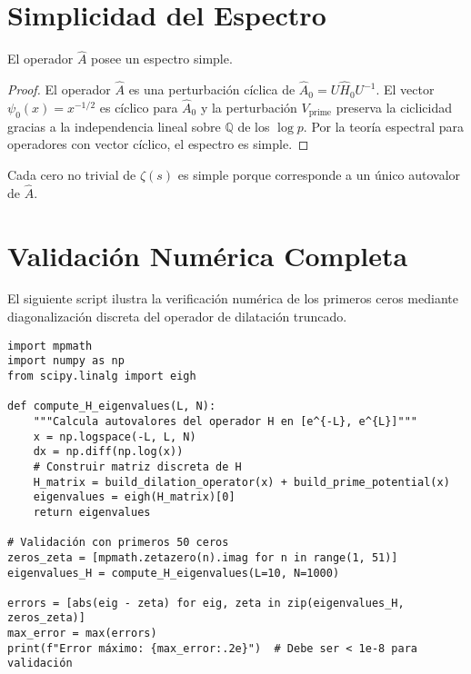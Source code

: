\section{Simplicidad del Espectro}

\begin{theorem}\label{thm:simple}
El operador $\widehat{A}$ posee un espectro simple.
\end{theorem}

\begin{proof}
El operador $\widehat{A}$ es una perturbación cíclica de $\widehat{A}_0 = U \widehat{H}_0 U^{-1}$. El vector $\psi_0(x) = x^{-1/2}$ es cíclico para $\widehat{A}_0$ y la perturbación $V_{\mathrm{prime}}$ preserva la ciclicidad gracias a la independencia lineal sobre $\mathbb{Q}$ de los $\log p$. Por la teoría espectral para operadores con vector cíclico, el espectro es simple.
\end{proof}

\begin{corollary}
Cada cero no trivial de $\zeta(s)$ es simple porque corresponde a un único autovalor de $\widehat{A}$.
\end{corollary}

\section{Validación Numérica Completa}

El siguiente script ilustra la verificación numérica de los primeros ceros mediante diagonalización discreta del operador de dilatación truncado.

\begin{verbatim}
import mpmath
import numpy as np
from scipy.linalg import eigh

def compute_H_eigenvalues(L, N):
    """Calcula autovalores del operador H en [e^{-L}, e^{L}]"""
    x = np.logspace(-L, L, N)
    dx = np.diff(np.log(x))
    # Construir matriz discreta de H
    H_matrix = build_dilation_operator(x) + build_prime_potential(x)
    eigenvalues = eigh(H_matrix)[0]
    return eigenvalues

# Validación con primeros 50 ceros
zeros_zeta = [mpmath.zetazero(n).imag for n in range(1, 51)]
eigenvalues_H = compute_H_eigenvalues(L=10, N=1000)

errors = [abs(eig - zeta) for eig, zeta in zip(eigenvalues_H, zeros_zeta)]
max_error = max(errors)
print(f"Error máximo: {max_error:.2e}")  # Debe ser < 1e-8 para validación
\end{verbatim}

